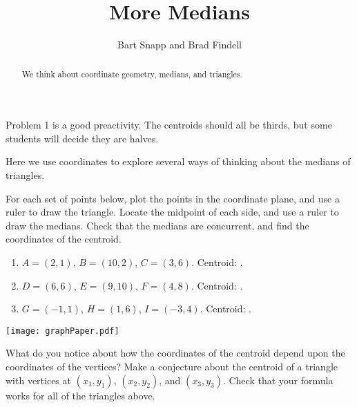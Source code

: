 \documentclass[nooutcomes]{ximera}
\title{More Medians}
\author{Bart Snapp and Brad Findell}
\begin{document}
\begin{abstract}
  We think about coordinate geometry, medians, and triangles.
\end{abstract}
\maketitle

\begin{teachingnote}
Problem 1 is a good preactivity.  The centroids should all be thirds, but some students will decide they are halves.  
\end{teachingnote}
Here we use coordinates to explore several ways of thinking about the medians of triangles.  

\begin{problem}
For each set of points below, plot the points in the coordinate plane, and use a ruler to draw the triangle.  Locate the midpoint of each side, and use a ruler to draw the medians.   Check that the medians are concurrent, and find the coordinates of the centroid.  
\begin{enumerate}
\setlength{\itemsep}{4pt}
\item $A=(2, 1)$, $B=(10, 2)$, $C=(3, 6)$.  Centroid: \underline{\hspace{1.5cm}}. 
\item $D=(6, 6)$, $E=(9, 10)$, $F=(4, 8)$.  Centroid: \underline{\hspace{1.5cm}}. 
\item $G=(-1, 1)$, $H=(1, 6)$, $I=(-3, 4)$.  Centroid: \underline{\hspace{1.5cm}}. 
\end{enumerate}

\begin{image}
\texttt{[image: graphPaper.pdf]}
\end{image}

\end{problem}
\newpage

\begin{problem}
What do you notice about how the coordinates of the centroid depend upon the coordinates of the vertices?  Make a conjecture about the centroid of a triangle with vertices at $(x_1, y_1)$, $(x_2, y_2)$, and $(x_3, y_3)$.  Check that your formula works for all of the triangles above.
\vfill
\end{problem}
\end{document}
